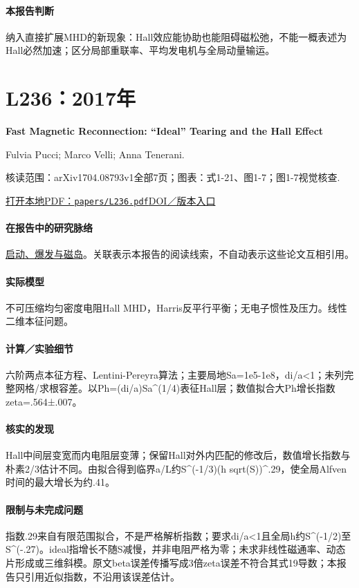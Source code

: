 \documentclass[UTF8,a4paper,11pt,openany,fontset=fandol]{ctexbook}
\begin{document}
\paragraph{本报告判断}纳入直接扩展MHD的新现象：Hall效应能协助也能阻碍磁松弛，不能一概表述为Hall必然加速；区分局部重联率、平均发电机与全局动量输运。

\section{L236：2017年}\label{paper:L236}

\textbf{Fast Magnetic Reconnection: “Ideal” Tearing and the Hall Effect}\citep{L236}\

Fulvia Pucci;  Marco Velli;  Anna Tenerani.

\textsf{核读范围：}arXiv1704.08793v1全部7页；\textsf{图表：}式1-21、图1-7；图1-7视觉核查.

\href{run:../papers/L236.pdf}{打开本地PDF：\texttt{papers/L236.pdf}}\quad\href{https://doi.org/10.3847/1538-4357/aa7b82}{DOI／版本入口}

\paragraph{在报告中的研究脉络}\hyperref[story:onset]{启动、爆发与磁岛}。关联表示本报告的阅读线索，不自动表示这些论文互相引用。

\paragraph{实际模型}不可压缩均匀密度电阻Hall MHD，Harris反平行平衡；无电子惯性及压力。线性二维本征问题。

\paragraph{计算／实验细节}六阶两点本征方程、Lentini-Pereyra算法；主要局地Sa=1e5-1e8，di/a<1；未列完整网格/求根容差。以Ph=(di/a)Sa\textasciicircum{}(1/4)表征Hall层；数值拟合大Ph增长指数zeta=.564±.007。

\paragraph{核实的发现}Hall中间层变宽而内电阻层变薄；保留Hall对外内匹配的修改后，数值增长指数与朴素2/3估计不同。由拟合得到临界a/L约S\textasciicircum{}(-1/3)(h sqrt(S))\textasciicircum{}.29，使全局Alfven时间的最大增长为约.41。

\paragraph{限制与未完成问题}指数.29来自有限范围拟合，不是严格解析指数；要求di/a<1且全局h约S\textasciicircum{}(-1/2)至S\textasciicircum{}(-.27)。ideal指增长不随S减慢，并非电阻严格为零；未求非线性磁通率、动态片形成或三维斜模。原文beta误差传播写成3倍zeta误差不符合其式19导数；本报告只引用近似指数，不沿用该误差估计。
\end{document}
